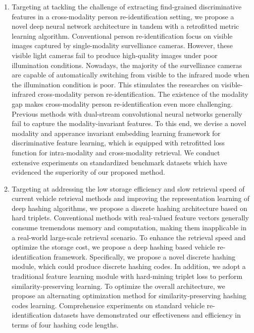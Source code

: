 \begin{abstract*}
\begin{enumerate}
  \item Targeting at tackling the challenge of extracting find-grained discriminative features in a cross-modality person re-identification setting, we propose a novel deep neural network architecture in tandem with a retrofitted metric learning algorithm.   Conventional person re-identification focus on visible images captured by single-modality survelliance cameras. However, these visible light cameras fail to produce high-quality images under poor illumination conditions. Nowadays, the majority of the survelliance cameras are capable of automatically switching from visible to the infrared mode when the illumination condition is poor. This stimulates the researches on visible-infrared cross-modality person re-identification. The existence of the modality gap makes cross-modality person re-identification even more challenging. Previous methods with dual-stream convolutional neural networks generally fail to capture the modality-invariant features. To this end, we devise a novel modality and apperance invariant embedding learning framework for discriminative feature learning, which is equipped with retrofitted loss function for intra-modality and cross-modality retrieval. We conduct extensive experiments on standardized benchmark datasets which have evidenced the superiority of our proposed method.
  \item Targeting at addressing the low storage efficiency and slow retrieval speed of current vehicle retrieval methods and improving the representation learning of deep hashing algorithms, we propose a discrete hashing architecture based on hard triplets. Conventional methods with real-valued feature vectors generally consume tremendous memory and computation, making them inapplicable in a real-world large-scale retrieval scenario. To enhance the retrieval speed and optimize the storage cost, we propose a deep hashing based vehicle re-identification framework.  Specifically, we propose a novel discrete hashing module, which could produce discrete hashing codes. In addition, we adopt a traditional feature learning module with hard-mining triplet loss to perform similarity-preserving learning. To optimize the overall architecture, we propose an alternating optimization method for similarity-preserving hashing codes learning.  Comprehensice experiments on standard vehicle re-identification datasets have demonstrated our effectiveness and efficiency in terms of four hashing code lengths.

\end{enumerate}
\end{abstract*}
